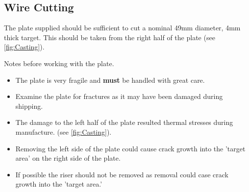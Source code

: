 \subsection{Wire Cutting}
The plate supplied should be sufficient to cut a nominal 49mm diameter, 4mm thick target. This should be taken from the right half of the plate (see \ref{fig:Casting}). 

Notes before working with the plate.
\begin{itemize}
\item The plate is very fragile and \textbf{must} be handled with great care. 
\item Examine the plate for fractures as it may have been damaged during shipping. 
\item The damage to the left half of the plate resulted thermal stresses during manufacture. (see \ref{fig:Casting}). 
\item Removing the left side of the plate could cause crack growth into the 'target area' on the right side of the plate.
\item If possible the riser should not be removed as removal could case crack growth into the 'target area.'
\end{itemize}